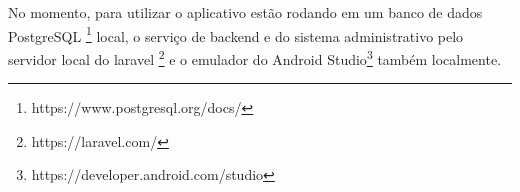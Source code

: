 No momento, para utilizar o aplicativo estão rodando em um banco de dados PostgreSQL \footnote{https://www.postgresql.org/docs/} local, o serviço de backend e do sistema administrativo pelo servidor local do laravel \footnote{https://laravel.com/} e o emulador do Android Studio\footnote{https://developer.android.com/studio} também localmente.

